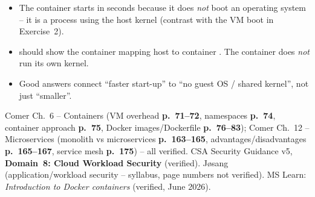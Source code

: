 \documentclass[11pt]{article}
\begin{document}
\begin{itemize}
\item The container starts in seconds because it does \emph{not} boot an operating system -- it is a
      process using the host kernel (contrast with the VM boot in Exercise~2).
\item {} should show the  container mapping host  to container
      . The container does \emph{not} run its own kernel.
\item Good answers connect ``faster start-up'' to ``no guest OS / shared kernel'', not just ``smaller''.
\end{itemize}

Comer Ch.~6 -- Containers (VM overhead \textbf{p.~71--72}, namespaces \textbf{p.~74}, container approach
\textbf{p.~75}, Docker images/Dockerfile \textbf{p.~76--83}); Comer Ch.~12 -- Microservices (monolith vs
microservices \textbf{p.~163--165}, advantages/disadvantages \textbf{p.~165--167}, service mesh
\textbf{p.~175}) -- all verified. CSA Security Guidance v5, \textbf{Domain~8: Cloud Workload Security}
(verified). J\o sang (application/workload security -- syllabus, page numbers not verified). MS Learn:
\emph{Introduction to Docker containers} (verified, June 2026).
\end{document}
